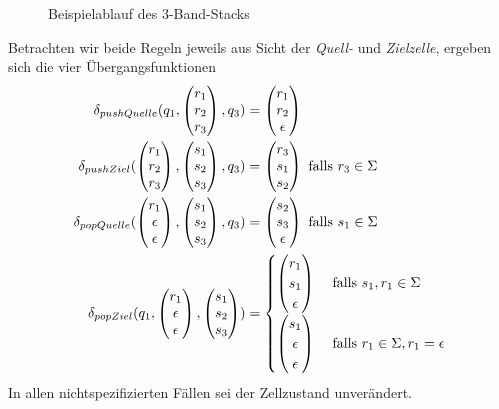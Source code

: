 \documentclass{article}
\begin{document}
\begin{figure}
    \caption{Beispielablauf des 3-Band-Stacks}
\end{figure}
Betrachten wir beide Regeln jeweils aus Sicht der \emph{Quell-} und \emph{Zielzelle}, ergeben sich die vier Übergangsfunktionen
\begin{align*}
    \delta_{pushQuelle}(q_1,\begin{pmatrix}r_1\\r_2\\r_3\end{pmatrix},q_3) &= \begin{pmatrix}r_1\\r_2\\\epsilon\end{pmatrix} \\
    \delta_{pushZiel}(\begin{pmatrix}r_1\\r_2\\r_3\end{pmatrix},\begin{pmatrix}s_1\\s_2\\s_3\end{pmatrix},q_3) &= \begin{pmatrix}r_3\\s_1\\s_2\end{pmatrix} \text{ falls } r_3 \in \Sigma \\
    \delta_{popQuelle}(\begin{pmatrix}r_1\\\epsilon\\\epsilon\end{pmatrix},\begin{pmatrix}s_1\\s_2\\s_3\end{pmatrix},q_3) &= \begin{pmatrix}s_2\\s_3\\\epsilon\end{pmatrix} \text { falls } s_1 \in \Sigma \\
    \delta_{popZiel}(q_1,\begin{pmatrix}r_1\\\epsilon\\\epsilon\end{pmatrix},\begin{pmatrix}s_1\\s_2\\s_3\end{pmatrix}) &= \begin{cases}
        \begin{pmatrix}r_1\\s_1\\\epsilon\end{pmatrix} &\text { falls } s_1,r_1 \in \Sigma \\
        \begin{pmatrix}s_1\\\epsilon\\\epsilon\end{pmatrix} &\text { falls } r_1 \in \Sigma, r_1 = \epsilon
    \end{cases}
\end{align*}
In allen nichtspezifizierten Fällen sei der Zellzustand unverändert.
\end{document}
